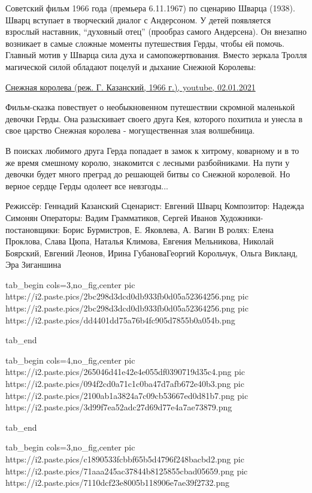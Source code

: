 \begin{itemize}
Советский фильм 1966 года (премьера 6.11.1967) по сценарию Шварца (1938). Шварц
вступает в творческий диалог с Андерсоном. У детей появляется взрослый
наставник, \enquote{духовный отец} (прообраз самого Андерсена). Он внезапно возникает в
самые сложные моменты путешествия Герды, чтобы ей помочь. Главный мотив у
Шварца сила духа и самопожертвования. Вместо зеркала Тролля магической силой
обладают поцелуй и дыхание Снежной Королевы:

\href{https://youtu.be/_XiBoSZwKUw}{%
Снежная королева (реж. Г. Казанский, 1966 г.), youtube, 02.01.2021%
}


Фильм-сказка повествует о необыкновенном путешествии скромной маленькой девочки
Герды. Она разыскивает своего друга Кея, которого похитила и унесла в свое
царство Снежная королева - могущественная злая волшебница.

В поисках любимого друга Герда попадает в замок к хитрому, коварному и в то же
время смешному королю, знакомится с лесными разбойниками. На пути у девочки
будет много преград до решающей битвы со Снежной королевой. Но верное сердце
Герды одолеет все невзгоды...

\obeycr
Режиссёр: Геннадий Казанский
Сценарист: Евгений Шварц
Композитор: Надежда Симонян
Операторы: Вадим Грамматиков, Сергей Иванов
Художники-постановщики: Борис Бурмистров, Е. Яковлева, А. Вагин 
В ролях: Елена Проклова, Слава Цюпа, Наталья Климова, Евгения Мельникова, Николай Боярский, Евгений Леонов, Ирина ГубановаГеоргий Корольчук, Ольга Викланд, Эра Зиганшина
\restorecr

\ifcmt
  tab_begin cols=3,no_fig,center
		pic https://i2.paste.pics/2bc298d3dcd0db933fb0d05a52364256.png
		pic https://i2.paste.pics/2bc298d3dcd0db933fb0d05a52364256.png
		pic https://i2.paste.pics/dd4401dd75a76b4fc905d7855b0a054b.png

  tab_end

  tab_begin cols=4,no_fig,center
		pic https://i2.paste.pics/265046d41e42e4e055df0390719d35c4.png
		pic https://i2.paste.pics/094f2cd0a71c1c0ba47d7afb672e40b3.png
		pic https://i2.paste.pics/2100ab1a3824a7c09cb53667ed0d81b7.png
		pic https://i2.paste.pics/3d99f7ea52adc27d69d77e4a7ae73879.png

  tab_end

  tab_begin cols=3,no_fig,center
		pic https://i2.paste.pics/c1890533fcbbf65b5d4796f248bacbd2.png
		pic https://i2.paste.pics/71aaa245ac37844b8125855cbad05659.png
		pic https://i2.paste.pics/7110dcf23e8005b118906e7ae39f2732.png


\end{itemize}
